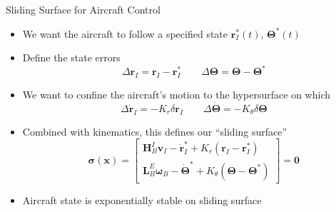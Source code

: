 \documentclass[aspectratio=169]{beamer}
\begin{document}
\begin{frame}{Sliding Surface for Aircraft Control}
    \begin{itemize}
        \item We want the aircraft to follow a specified state $\mathbf{r}^*_I(t)$, $\boldsymbol{\Theta}^*(t)$
        \item Define the state errors
        \begin{equation*}
            \Delta \mathbf{r}_I = \mathbf{r}_I - \mathbf{r}_I^* \qquad \Delta \boldsymbol{\Theta} = \boldsymbol{\Theta}-\boldsymbol{\Theta}^*
        \end{equation*}
        \item We want to confine the aircraft's motion to the hypersurface on which
        \begin{equation*}
            \Delta \dot{\mathbf{r}}_I= -K_r \delta \mathbf{r}_I \qquad \Delta \dot{\boldsymbol{\Theta}} = -K_\theta \delta \boldsymbol{\Theta}
        \end{equation*}
        \item Combined with kinematics, this defines our ``sliding surface''
        \begin{equation*}
            \boldsymbol{\sigma}(\mathbf{x}) = 
            \begin{bmatrix}
                \mathbf{H}_B^I \mathbf{v}_I - \dot{\mathbf{r}}_I^* + K_r ( \mathbf{r}_I - \mathbf{r}_I^*) \\
                \mathbf{L}_B^E \boldsymbol{\omega}_B - \dot{\boldsymbol{\Theta}}^* + K_\theta(\boldsymbol{\Theta}-\boldsymbol{\Theta}^*) 
            \end{bmatrix} = \mathbf{0}
        \end{equation*}
        \item Aircraft state is exponentially stable on sliding surface
    \end{itemize}
\end{frame}
\end{document}
